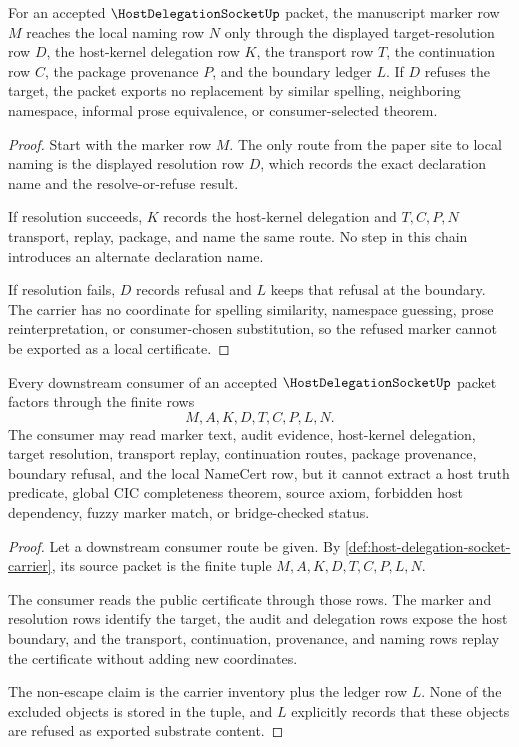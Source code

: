 \begin{theorem}
\label{thm:host-delegation-socket-lean-marker-boundary}
For an accepted $\HostDelegationSocketUp$ packet, the manuscript marker row $M$ reaches the local naming row $N$ only through the displayed target-resolution row $D$, the host-kernel delegation row $K$, the transport row $T$, the continuation row $C$, the package provenance $P$, and the boundary ledger $L$. If $D$ refuses the target, the packet exports no replacement by similar spelling, neighboring namespace, informal prose equivalence, or consumer-selected theorem.
\end{theorem}
\begin{proof}
Start with the marker row $M$. The only route from the paper site to local naming is the displayed resolution row $D$, which records the exact declaration name and the resolve-or-refuse result.

If resolution succeeds, $K$ records the host-kernel delegation and $T,C,P,N$ transport, replay, package, and name the same route. No step in this chain introduces an alternate declaration name.

If resolution fails, $D$ records refusal and $L$ keeps that refusal at the boundary. The carrier has no coordinate for spelling similarity, namespace guessing, prose reinterpretation, or consumer-chosen substitution, so the refused marker cannot be exported as a local certificate.
\end{proof}

\begin{theorem}
\label{thm:host-delegation-socket-non-escape}
Every downstream consumer of an accepted $\HostDelegationSocketUp$ packet factors through the finite rows
$$
M,A,K,D,T,C,P,L,N.
$$
The consumer may read marker text, audit evidence, host-kernel delegation, target resolution, transport replay, continuation routes, package provenance, boundary refusal, and the local NameCert row, but it cannot extract a host truth predicate, global CIC completeness theorem, source axiom, forbidden host dependency, fuzzy marker match, or bridge-checked status.
\end{theorem}
\begin{proof}
Let a downstream consumer route be given. By \autoref{def:host-delegation-socket-carrier}, its source packet is the finite tuple $M,A,K,D,T,C,P,L,N$.

The consumer reads the public certificate through those rows. The marker and resolution rows identify the target, the audit and delegation rows expose the host boundary, and the transport, continuation, provenance, and naming rows replay the certificate without adding new coordinates.

The non-escape claim is the carrier inventory plus the ledger row $L$. None of the excluded objects is stored in the tuple, and $L$ explicitly records that these objects are refused as exported substrate content.
\end{proof}

